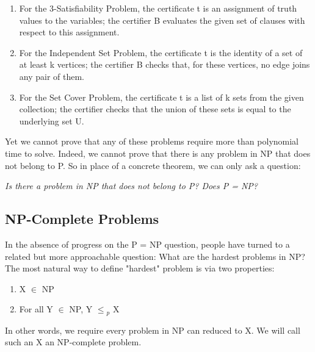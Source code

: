 \documentclass{article}
\begin{document}
\begin{enumerate}
    \item For the 3-Satisfiability Problem, the certificate t is an assignment of truth values to the variables; the certifier B evaluates the given set of clauses with respect to this assignment.
    \item For the Independent Set Problem, the certificate t is the identity of a set of at least k vertices; the certifier B checks that, for these vertices, no edge joins any pair of them.
    \item For the Set Cover Problem, the certificate t is a list of k sets from the given collection; the certifier checks that the union of these sets is equal to the underlying set U.
\end{enumerate}

Yet we cannot prove that any of these problems require more than polynomial time to solve. Indeed, we cannot prove that there is any problem in NP that does not belong to P. So in place of a concrete theorem, we can only ask a question:\\

\begin{center}
    \emph{Is there a problem in NP that does not belong to P? Does P = NP?}
\end{center}

\subsection{NP-Complete Problems}
In the absence of progress on the P = NP question, people have turned to a related but more approachable question: What are the hardest problems in NP? The most natural way to define "hardest" problem is via two properties:\\

\begin{enumerate}
    \item X $\in$ NP
    \item For all Y $\in$ NP, Y $\le$$_p$ X
\end{enumerate}

In other words, we require every problem in NP can reduced to X. We will call such an X an NP-complete problem.\\

\\
\end{document}
